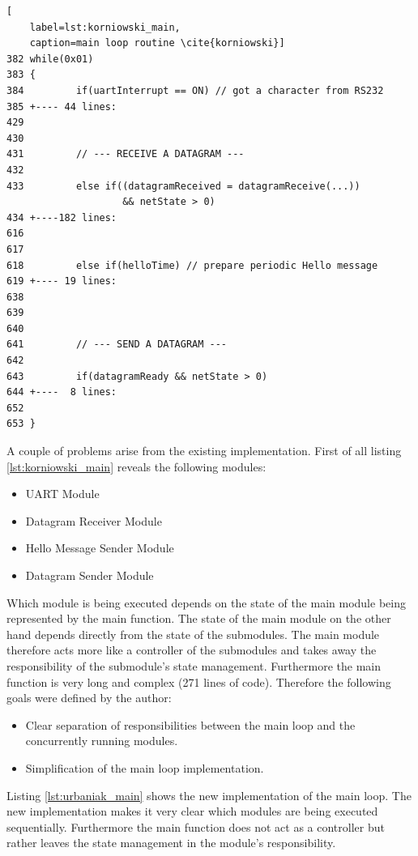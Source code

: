 \begin{lstlisting}[
	label=lst:korniowski_main,
	caption=main loop routine \cite{korniowski}]
382 while(0x01)
383 {
384         if(uartInterrupt == ON) // got a character from RS232
385 +---- 44 lines: 
429 
430 
431         // --- RECEIVE A DATAGRAM ---
432 
433         else if((datagramReceived = datagramReceive(...)) 
                    && netState > 0)     
434 +----182 lines: 
616 
617     
618         else if(helloTime) // prepare periodic Hello message
619 +---- 19 lines: 
638 
639 
640     
641         // --- SEND A DATAGRAM ---
642     
643         if(datagramReady && netState > 0)
644 +----  8 lines: 
652 
653 }
\end{lstlisting}

A couple of problems arise from the existing implementation. First of all listing \ref{lst:korniowski_main} reveals the following modules:

\begin{itemize}
\item UART Module
\item Datagram Receiver Module
\item Hello Message Sender Module
\item Datagram Sender Module
\end{itemize}

Which module is being executed depends on the state of the main module being represented by the main function. The state of the main module on the other hand depends directly from the state of the submodules. The main module therefore acts more like a controller of the submodules and takes away the responsibility of the submodule's state management. Furthermore the main function is very long and complex (271 lines of code). Therefore the following goals were defined by the author:

\begin{itemize}
\item Clear separation of responsibilities between the main loop and the concurrently running modules.
\item Simplification of the main loop implementation.
\end{itemize}

Listing \ref{lst:urbaniak_main} shows the new implementation of the main loop. The new implementation makes it very clear which modules are being executed sequentially. Furthermore the main function does not act as a controller but rather leaves the state management in the module's responsibility.

